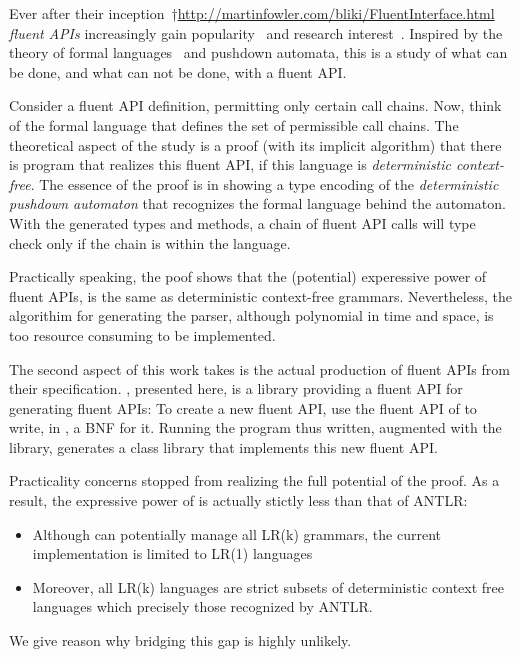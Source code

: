 Ever after their inception~†{\url{http://martinfowler.com/bliki/FluentInterface.html}} \emph{fluent APIs}
  increasingly gain popularity~\cite{Bauer:2005,Freeman:Pryce:06,Larsen:2012} and research
  interest~\cite{Deursen:2000,Kabanov:2008}.
Inspired by the theory of formal languages~\cite{Linz:2001} and pushdown automata,
  this is a study of what can be done, and what can not be done, with a fluent API.

Consider a fluent API definition, permitting only certain call chains.
Now, think of the formal language that defines the set of permissible call chains.
The theoretical aspect of the study is a proof (with its implicit algorithm) that
  there is \Java program that realizes this fluent API, if this
  language is \emph{deterministic context-free}.
The essence of the proof is in showing a \Java type encoding of
  the \emph{deterministic pushdown automaton} that recognizes
  the formal language behind the automaton.
With the generated types and methods, a chain of fluent API calls
  will type check only if the chain is within the language.

Practically speaking, the poof shows that the (potential)
  experessive power of fluent APIs,
  is the same as deterministic context-free grammars.
Nevertheless, the algorithim for generating the parser, although polynomial
  in time and space, is too resource consuming to be implemented. 

The second aspect of this work takes is the actual production 
  of fluent APIs from their specification.
\Self, presented here, is a \Java library providing a fluent API for generating fluent APIs:
To create a new fluent API, use the fluent API of \Self to write, in \Java, a BNF for it.
Running the \Java program thus written, augmented with the \Self library,
  generates a \Java class library that implements this new fluent API.

Practicality concerns stopped \Self from realizing the full potential of the proof.
As a result, the expressive power of \Self is actually stictly less than that of ANTLR:
\begin{itemize}
  \item Although \Self can potentially manage all LR(k) grammars,
        the current implementation is limited to LR(1) languages
  \item Moreover, all LR(k) languages are strict subsets of deterministic context free languages %
      which precisely those recognized by ANTLR. %
\end{itemize}
We give reason why bridging this gap is highly unlikely.

